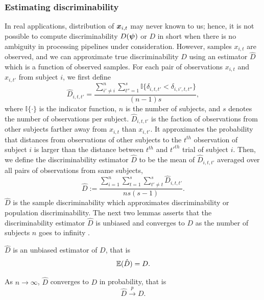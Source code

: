 \documentclass{article}
\begin{document}
\subsubsection{Estimating discriminability}
In real applications, distribution of $\boldsymbol{x}_{i,t}$ may never known to us; hence, it is not possible to compute discriminability $D(\boldsymbol{\psi})$ or $D$ in short when there is no ambiguity in processing pipelines under consideration. However, samples $x_{i,t}$ are observed, and we can approximate true discriminability $D$ using an estimator $\hat{D}$ which is a function of observed samples. For each pair of observations $x_{i,t}$ and $x_{i,t'}$ from subject $i$, we first define
\[ \hat{D}_{i,t,t'} = \frac{\sum\limits_{i' \neq i}^{n} \sum\limits_{t''=1}^{s} \mathbb{I}\{\delta_{i,t,t'} < \delta_{i,i',t,t''} \} }{(n-1)s},\]
where $\mathbb{I}\{ \cdot \} $ is the indicator function, $n$ is the number of subjects, and $s$ denotes the number of observations per subject. $\hat{D}_{i,t,t'}$ is the faction of observations from other subjects farther away from $x_{i,t}$ than $x_{i,t'}$. It approximates the probability that distances from observations of other subjects to the $t^{th}$ observation of subject $i$ is larger than the distance between $t^{th}$ and $t'^{th}$ trial of subject $i$. Then, we define the discriminability estimator $\hat{D}$ to be the mean of $\hat{D}_{i,t,t'}$ averaged over all pairs of observations from same subjects,
\[ \hat{D} := \frac{\sum\limits_{i=1}^{n} \sum\limits_{t=1}^{s}  \sum\limits_{t' \neq t}^{s} \hat{D}_{i,t,t'}}{ns(s-1)} .\]
$\hat{D}$ is the sample discriminability which approximates discriminability or population discriminability. The next two lemmas asserts that the discriminability estimator $\hat{D}$ is unbiased and converges to $D$ as the number of subjects $n$ goes to infinity \cite{bickel2015mathematical}.

\begin{lem}	
	$\hat{D}$ is an unbiased estimator of $D$, that is
	\[ \mathbb{E}(\hat{D}) = D.\]
	\label{lem:lem1}
\end{lem}

\begin{lem}	
	As $n \rightarrow \infty$, $\hat{D}$ converges to $D$ in probability, that is
	\[\hat{D} \overset{p}{\rightarrow} D .\]
	\label{lem:lem2}
\end{lem}
\end{document}
